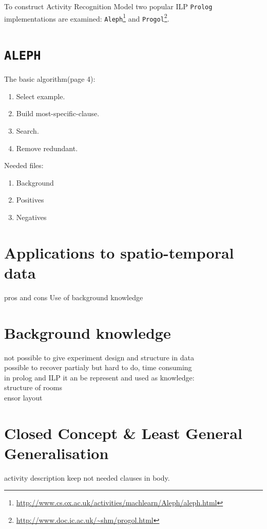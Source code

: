 \documentclass[12pt, a4paper, pdflatex, leqno, twoside, openright]{report}
\begin{document}
To construct Activity Recognition Model two popular ILP \texttt{Prolog} implementations are examined: \texttt{Aleph}\footnote{\url{http://www.cs.ox.ac.uk/activities/machlearn/Aleph/aleph.html}} and \texttt{Progol}\footnote{\url{http://www.doc.ic.ac.uk/~shm/progol.html}}.

  \section{\texttt{ALEPH}}
The basic algorithm(page 4):\\
\begin{enumerate}
  \item Select example.
  \item Build most-specific-clause.
  \item Search.
  \item Remove redundant.
\end{enumerate}

Needed files:
\begin{enumerate}
  \item Background
  \item Positives
  \item Negatives
\end{enumerate}


  \section{Applications to spatio-temporal data}
pros and cons Use of background knowledge

  \section{Background knowledge}
not possible to give experiment design and structure in data\\
possible to recover partialy but hard to do, time consuming\\

in prolog and ILP it an be represent and used as knowledge:\\
structure of rooms\\
ensor layout\\

  \section{Closed Concept \& Least General Generalisation}
activity description
keep not needed clauses in body.
\end{document}
